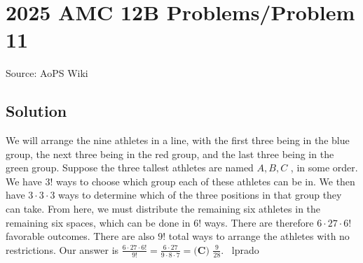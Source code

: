 \documentclass[12pt]{article}
\begin{document}
\section*{{2025 AMC 12B Problems/Problem 11}}
Source: AoPS Wiki

\subsection*{Solution}
We will arrange the nine athletes in a line, with the first three being in the blue group, the next three being in the red group, and the last three being in the green group. Suppose the three tallest athletes are named $A, B, C$ , in some order. We have $3!$ ways to choose which group each of these athletes can be in. We then have $3 \cdot 3 \cdot 3$ ways to determine which of the three positions in that group they can take. From here, we must distribute the remaining six athletes in the remaining six spaces, which can be done in $6!$ ways. There are therefore $6 \cdot 27 \cdot 6!$ favorable outcomes. There are also $9!$ total ways to arrange the athletes with no restrictions. Our answer is $\frac{6 \cdot 27 \cdot 6!}{9!} = \frac{6 \cdot 27}{9 \cdot 8 \cdot 7} = \boxed{\textbf{(C) }\frac{9}{28}}.$ ~lprado
\end{document}
